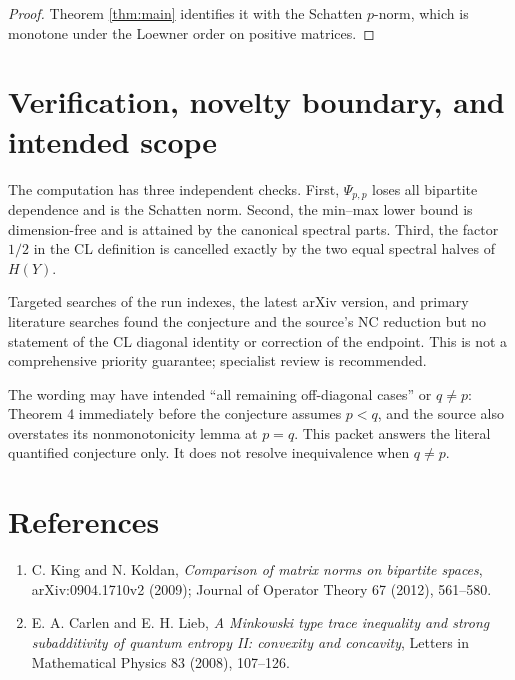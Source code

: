 \documentclass[11pt]{article}
\begin{document}
\begin{proof}
Theorem \ref{thm:main} identifies it with the Schatten $p$-norm, which is
monotone under the Loewner order on positive matrices.
\end{proof}

\section{Verification, novelty boundary, and intended scope}

The computation has three independent checks.  First,
$\Psi_{p,p}$ loses all bipartite dependence and is the Schatten norm.
Second, the min--max lower bound is dimension-free and is attained by the
canonical spectral parts.  Third, the factor $1/2$ in the CL definition is
cancelled exactly by the two equal spectral halves of $H(Y)$.

Targeted searches of the run indexes, the latest arXiv version, and primary
literature searches found the conjecture and the source's NC reduction but no
statement of the CL diagonal identity or correction of the endpoint.  This is
not a comprehensive priority guarantee; specialist review is recommended.

The wording may have intended ``all remaining off-diagonal cases'' or
$q\ne p$: Theorem 4 immediately before the conjecture assumes $p<q$, and
the source also overstates its nonmonotonicity lemma at $p=q$.  This packet
answers the literal quantified conjecture only.  It does not resolve
inequivalence when $q\ne p$.

\section*{References}

\begin{enumerate}
\item C. King and N. Koldan, \emph{Comparison of matrix norms on bipartite
spaces}, arXiv:0904.1710v2 (2009); Journal of Operator Theory 67 (2012),
561--580.
\item E. A. Carlen and E. H. Lieb, \emph{A Minkowski type trace inequality
and strong subadditivity of quantum entropy II: convexity and concavity},
Letters in Mathematical Physics 83 (2008), 107--126.
\end{enumerate}
\end{document}
